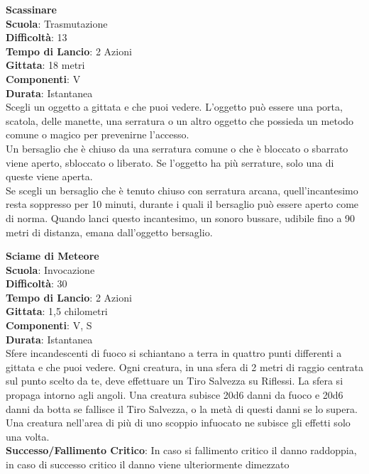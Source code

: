 \begin{multicols}{2}
\medskip\textbf{Scassinare}\\
\textbf{Scuola}: Trasmutazione\\
\textbf{Difficoltà}:  13\\
\textbf{Tempo di Lancio}: 2 Azioni\\
\textbf{Gittata}: 18 metri\\
\textbf{Componenti}: V\\
\textbf{Durata}: Istantanea\\
Scegli un oggetto a gittata e che puoi vedere. L’oggetto può essere una porta, scatola, delle manette, una serratura o un altro oggetto che possieda un metodo comune o magico per prevenirne l’accesso.\\
Un bersaglio che è chiuso da una serratura comune o che è bloccato o sbarrato viene aperto, sbloccato o liberato. Se l’oggetto ha più serrature, solo una di queste viene aperta.\\
Se scegli un bersaglio che è tenuto chiuso con serratura arcana, quell'incantesimo resta soppresso per 10 minuti, durante i quali il bersaglio può essere aperto come di norma. Quando lanci questo incantesimo, un sonoro bussare, udibile fino a 90 metri di distanza, emana dall'oggetto bersaglio.

\medskip\textbf{Sciame di Meteore}\\
\textbf{Scuola}: Invocazione\\
\textbf{Difficoltà}:  30\\
\textbf{Tempo di Lancio}: 2 Azioni\\
\textbf{Gittata}: 1,5 chilometri\\
\textbf{Componenti}: V, S\\
\textbf{Durata}: Istantanea\\
Sfere incandescenti di fuoco si schiantano a terra in quattro punti differenti a gittata e che puoi vedere. Ogni creatura, in una sfera di 2 metri di raggio centrata sul punto scelto da te, deve effettuare un Tiro Salvezza su Riflessi. La sfera si propaga intorno agli angoli. Una creatura subisce 20d6 danni da fuoco e 20d6 danni da botta se fallisce il Tiro Salvezza, o la metà di
questi danni se lo supera. Una creatura nell'area di più di uno scoppio infuocato ne subisce gli effetti solo una volta.\\
\textbf{Successo/Fallimento Critico}: In caso si fallimento critico il danno raddoppia, in caso di successo critico il danno viene ulteriormente dimezzato


\end{multicols}
